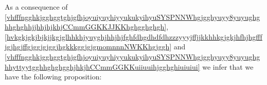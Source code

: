 \documentclass{article}
\theoremstyle{definition}
\theoremstyle{remark}
\renewcommand{\vec}[1]{\mathbf{#1}}
\newcommand{\er}{\eqref}
\newcommand{\er}{\eqref}
\begin{document}
\begin{comment}
v\right|^2\right)\left(\frac{1}{4\pi c}\,\vec D\times \vec
B\right)\right\}-\frac{1}{4\pi G}div_{\vec
x}\left\{\Phi\frac{\partial}{\partial t}(\nabla_{\vec
x}\Phi)\right\}+\vec F\cdot\vec u =\\-div_\vec
x\left\{\left(\frac{\mu|\vec u|^2}{2}\right)\vec
u+\left(\frac{Q|\vec v|^2}{2}\right)\vec v+\frac{1}{2}\left|\vec
v\right|^2\left(\frac{1}{4\pi c}\,\vec D\times \vec
B\right)+\left(\frac{\vec D\cdot\vec E+\vec B\cdot\vec
H}{8\pi}\right)\vec v\right\}
\\
+\frac{1}{4\pi}div_\vec x\left\{(\vec D\otimes \vec D+ \vec B\otimes
\vec B)\cdot \vec v-\frac{1}{2}\left(|\vec D|^2+|\vec
B|^2\right)\vec v-c \vec D\times \vec B\right\}\\-div_\vec
x\left\{\Phi\left(\mu\vec u+Q\vec v+\frac{1}{4\pi c}\,\vec D\times
\vec B\right)\right\}
-\frac{1}{4\pi G}div_{\vec
x}\left\{\Phi\frac{\partial}{\partial t}(\nabla_{\vec
x}\Phi)\right\}+\vec F\cdot\vec u.
\end{multline}
\end{comment}
%
%
%
%
As a consequence of
\er{vhfffngghkjgghggtghjgfhjoyuiyuyhiyyukukyihyuSYSPNNWhgjgghyuyy8yuyughghhghghhjjhhjhjkhjCCmmGGKKJJKKhghgghghgh},
\er{hvkgkjgkjbjkjjkgjglhhkhjyuyghjhhjhjfghfdhgdhdfdhzzzyyyjffjjkkhhkgjgkjhfhjhgfffjgjhgjffgjggjgjggjhgkkkggjgjgmomnnnNWKKhgjggh}
and
\er{vhfffngghkjgghggtghjgfhjoyuiyuyhiyyukukyihyuSYSPNNWhgjgghyuyy8yuyughghhyttyytgghhghghgghjhkjhCCmmGGKKuiiuuihjgghghiuiuiui}
we infer that we have the following proposition:
\end{document}
